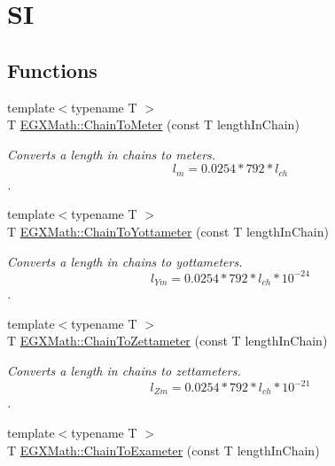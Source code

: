 \hypertarget{group___e_g_x_math-_conversions-_length_conversions-_imperial-_chain-_s_i}{}\section{SI}
\label{group___e_g_x_math-_conversions-_length_conversions-_imperial-_chain-_s_i}
\subsection*{Functions}
\begin{DoxyCompactItemize}
\item 
{\footnotesize template$<$typename T $>$ }\\T \mbox{\hyperlink{group___e_g_x_math-_conversions-_length_conversions-_imperial-_chain-_s_i_ga94f1a1b0e10796717226224d825e0490}{E\+G\+X\+Math\+::\+Chain\+To\+Meter}} (const T length\+In\+Chain)
\begin{DoxyCompactList}\small\item\em Converts a length in chains to meters. \[ l_{m}=0.0254 * 792 * l_{ch} \]. \end{DoxyCompactList}\item 
{\footnotesize template$<$typename T $>$ }\\T \mbox{\hyperlink{group___e_g_x_math-_conversions-_length_conversions-_imperial-_chain-_s_i_ga033ed288c43416b74a897a3902cc49b2}{E\+G\+X\+Math\+::\+Chain\+To\+Yottameter}} (const T length\+In\+Chain)
\begin{DoxyCompactList}\small\item\em Converts a length in chains to yottameters. \[ l_{Ym}=0.0254 * 792 * l_{ch} * 10^{-24} \]. \end{DoxyCompactList}\item 
{\footnotesize template$<$typename T $>$ }\\T \mbox{\hyperlink{group___e_g_x_math-_conversions-_length_conversions-_imperial-_chain-_s_i_ga8fe1fdac139b7f842766aedd772527eb}{E\+G\+X\+Math\+::\+Chain\+To\+Zettameter}} (const T length\+In\+Chain)
\begin{DoxyCompactList}\small\item\em Converts a length in chains to zettameters. \[ l_{Zm}=0.0254 * 792 * l_{ch} * 10^{-21} \]. \end{DoxyCompactList}\item 
{\footnotesize template$<$typename T $>$ }\\T \mbox{\hyperlink{group___e_g_x_math-_conversions-_length_conversions-_imperial-_chain-_s_i_ga82f07f687e804faabd25839c5066792a}{E\+G\+X\+Math\+::\+Chain\+To\+Exameter}} (const T length\+In\+Chain)

\end{DoxyCompactItemize}
